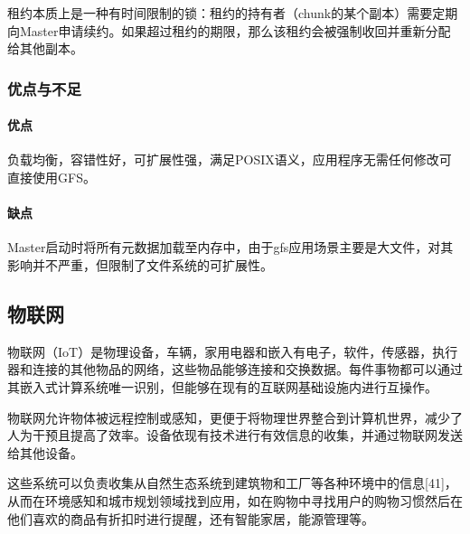 \documentclass{ctexart}
\begin{document}
租约本质上是一种有时间限制的锁：租约的持有者（chunk的某个副本）需要定期向Master申请续约。如果超过租约的期限，那么该租约会被强制收回并重新分配给其他副本。
\subsubsection{优点与不足}
\paragraph{优点}
负载均衡，容错性好，可扩展性强，满足POSIX语义，应用程序无需任何修改可直接使用GFS。
\paragraph{缺点}
Master启动时将所有元数据加载至内存中，由于gfs应用场景主要是大文件，对其影响并不严重，但限制了文件系统的可扩展性。
\subsection{物联网}
物联网（IoT）是物理设备，车辆，家用电器和嵌入有电子，软件，传感器，执行器和连接的其他物品的网络，这些物品能够连接和交换数据。每件事物都可以通过其嵌入式计算系统唯一识别，但能够在现有的互联网基础设施内进行互操作。\cite{IoT}

物联网允许物体被远程控制或感知，更便于将物理世界整合到计算机世界，减少了人为干预且提高了效率。设备依现有技术进行有效信息的收集，并通过物联网发送给其他设备。

这些系统可以负责收集从自然生态系统到建筑物和工厂等各种环境中的信息[41]，从而在环境感知和城市规划领域找到应用，如在购物中寻找用户的购物习惯然后在他们喜欢的商品有折扣时进行提醒，还有智能家居，能源管理等。
\end{document}
